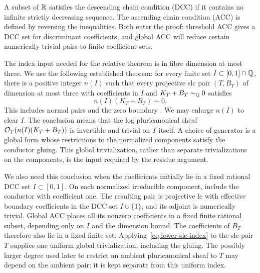 A subset of $\mathbb R$ satisfies the descending chain condition (DCC) if it
contains no infinite strictly decreasing sequence.  The ascending chain
condition (ACC) is defined by reversing the inequalities.  Both enter
the proof: threshold ACC gives a DCC set for discriminant coefficients,
and global ACC will reduce certain numerically trivial pairs to finite
coefficient sets.

The index input needed for the relative theorem is in fibre dimension at
most three.  We use the following established theorem: for every finite
set $I\subset[0,1]\cap\mathbb Q$, there is a positive integer $n(I)$ such that
every projective slc pair $(T,B_T)$ of dimension at most three with
coefficients in $I$ and $K_T+B_T\sim_\mathbb Q0$ satisfies
\begin{equation}\label{eq:lower-slc-index}
 n(I)(K_T+B_T)\sim 0.
\end{equation}
This includes normal pairs and the zero boundary
\cite[Corollary~1.6, arXiv version~1]{JiangLiu2021}.  We may enlarge
$n(I)$ to clear $I$.  The conclusion means that the log pluricanonical
sheaf $\mathcal O_T(n(I)(K_T+B_T))$ is invertible and trivial on $T$ itself.  A
choice of generator is a global form whose restrictions to the
normalized components satisfy the conductor gluing.  This global
trivialization, rather than separate trivializations on the components,
is the input required by the residue argument.

We also need this conclusion when the coefficients initially lie in a
fixed rational DCC set $I\subset[0,1]$.  On each normalized irreducible
component, include the conductor with coefficient one.  The resulting
pair is projective lc with effective boundary coefficients in the DCC
set $I\cup\{1\}$, and its adjoint is numerically trivial.  Global ACC
\cite[Theorem~1.5]{HMX2014} places all its nonzero coefficients in a
fixed finite rational subset, depending only on $I$ and the dimension
bound.  The coefficients of $B_T$ therefore also lie in a fixed finite
set.  Applying~\eqref{eq:lower-slc-index} to the slc pair $T$ supplies one
uniform global trivialization, including the gluing.  The possibly larger
degree used later to restrict an ambient pluricanonical sheaf to $T$ may
depend on the ambient pair; it is kept separate from this uniform index.

